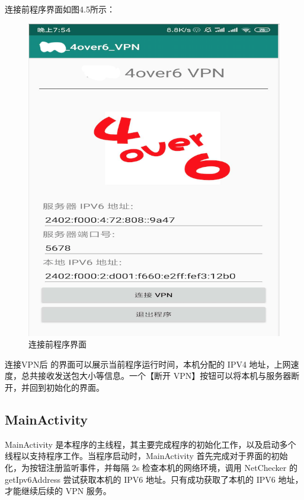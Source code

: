 连接前程序界面如图4.5所示：
\begin{figure}[!ht]
	\begin{center}
	\includegraphics[scale=.58]{connect1.png}
	\end{center}
	\caption{连接前程序界面}
	\label{figure:连接前程序界面}
\end{figure}

连接VPN后 的界面可以展示当前程序运行时间，本机分配的 IPV4 地址，上网速度，总共接收发送包大小等信息。一个【断开 VPN】按钮可以将本机与服务器断开，并回到初始化的界面。


\subsection{MainActivity}
MainActivity 是本程序的主线程，其主要完成程序的初始化工作，以及启动多个线程以支持程序工作。当程序启动时，MainActivity 首先完成对于界面的初始化，为按钮注册监听事件，并每隔 2s 检查本机的网络环境，调用 NetChecker 的 getIpv6Address 尝试获取本机的 IPV6 地址。只有成功获取了本机的 IPV6 地址，才能继续后续的 VPN 服务。

